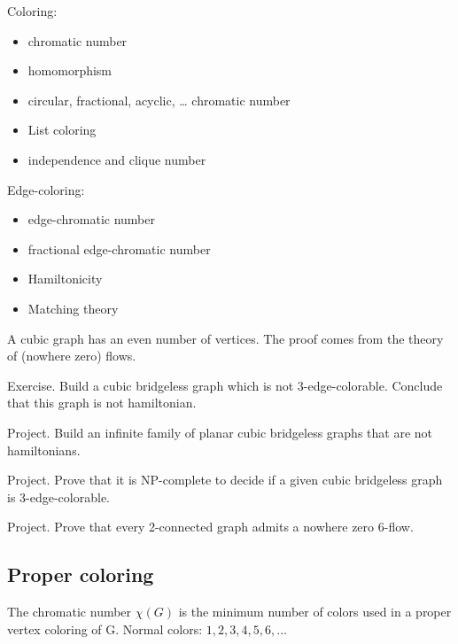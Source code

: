 \documentclass[12pt,a4paper]{article}
\begin{document}
Coloring:
\begin{itemize}
\item chromatic number
\item homomorphism
\item circular, fractional, acyclic, … chromatic number
\item List coloring
\item independence and clique number
\end{itemize}

Edge-coloring:
\begin{itemize}
\item edge-chromatic number
\item fractional edge-chromatic number
\item Hamiltonicity
\item Matching theory
\end{itemize}

A cubic graph has an even number of vertices. The proof comes from the theory of
(nowhere zero) flows.

Exercise. Build a cubic bridgeless graph which is not 3-edge-colorable. Conclude
that this graph is not hamiltonian.

Project. Build an infinite family of planar cubic bridgeless graphs that are not
hamiltonians.

Project. Prove that it is NP-complete to decide if a given cubic bridgeless
graph is 3-edge-colorable.

Project. Prove that every 2-connected graph admits a nowhere zero 6-flow.

\subsection{Proper coloring}

\begin{center}
\end{center}

The chromatic number \(\chi(G)\) is the minimum number of colors used in a
proper vertex coloring of G. Normal colors: \(1, 2, 3, 4, 5, 6, \dots\)
\end{document}
